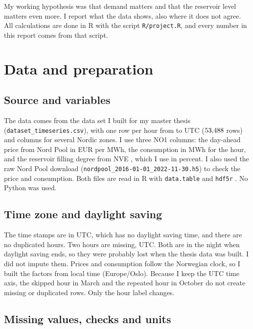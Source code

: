 \documentclass[12pt]{article}
\begin{document}
My working hypothesis was that demand matters and that the reservoir level matters even more. I report what the data shows, also where it does not agree. All calculations are done in R \parencite{R} with the script \texttt{R/project.R}, and every number in this report comes from that script.

\section{Data and preparation}\label{sec:data}

\subsection{Source and variables}

The data comes from the data set I built for my master thesis (\texttt{dataset\_timeseries.csv}), with one row per hour from \rawStart{} to \rawEnd{} UTC ($53{,}488$ rows) and columns for several Nordic zones. I use three NO1 columns: the day-ahead price from Nord Pool \parencite{nordpool} in EUR per MWh, the consumption in MWh for the hour, and the reservoir filling degree from NVE \parencite{nve}, which I use in percent. I also used the raw Nord Pool download (\texttt{nordpool\_2016-01-01\_2022-11-30.h5}) to check the price and consumption. Both files are read in R with \texttt{data.table} \parencite{datatable} and \texttt{hdf5r} \parencite{hdfr}. No Python was used.

\subsection{Time zone and daylight saving}

The time stamps are in UTC, which has no daylight saving time, and there are no duplicated hours. Two hours are missing, \missingHours{} UTC. Both are in the night when daylight saving ends, so they were probably lost when the thesis data was built. I did not impute them. Prices and consumption follow the Norwegian clock, so I built the factors from local time (Europe/Oslo). Because I keep the UTC time axis, the skipped hour in March and the repeated hour in October do not create missing or duplicated rows. Only the hour label changes.

\subsection{Missing values, checks and units}
\end{document}
